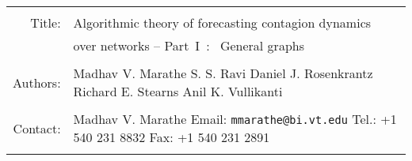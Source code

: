 
\begin{titlepage}

{





\normalsize
{}
\vspace{0.2in}
\normalsize{\rightline{\today}}

\vspace{0.05in}
\noindent\begin{tabular}{r|p{}}
\rule[0.25in]{0pt}{0pt} & \\
Title:&\normalsize{Algorithmic theory of forecasting contagion dynamics} \\
      &\normalsize{over networks -- Part~I~:~ General graphs} \\
\rule[0.5in]{0pt}{0pt} & \\
Authors: &
\small{
Madhav V. Marathe\newline
S. S. Ravi\newline
Daniel J. Rosenkrantz\newline
Richard E. Stearns\newline
Anil K. Vullikanti}\\


\rule[0.25in]{0pt}{0pt} & \\
Contact: &
\small{Madhav V. Marathe\newline
 Email: {\tt mmarathe@bi.vt.edu} \newline
 Tel.: +1 540 231 8832\newline
 Fax: +1 540 231 2891} \\
\rule[0.25in]{0pt}{0pt} & \\




\end{tabular}}
\end{titlepage}
